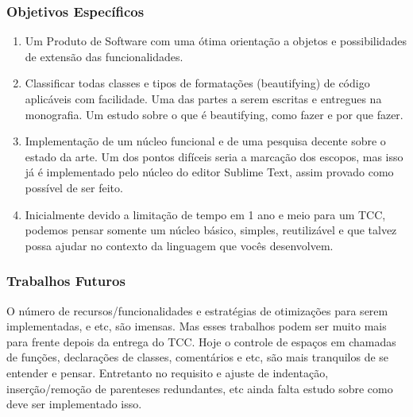 {\begin{enumerate}[leftmargin=*]
    \end{enumerate}


\subsubsection{Objetivos Específicos}


    \begin{enumerate}[leftmargin=*]

        \item

        Um Produto de Software com uma ótima orientação a objetos e possibilidades de extensão das
        funcionalidades.

        \item

        Classificar todas classes e tipos de formatações (beautifying) de código aplicáveis com
        facilidade. Uma das partes a serem escritas e entregues na monografia. Um estudo sobre o que
        é beautifying, como fazer e por que fazer.

        \item

        Implementação de um núcleo funcional e de uma pesquisa decente sobre o estado da arte. Um
        dos pontos difíceis seria a marcação dos escopos, mas isso já é implementado pelo núcleo do
        editor Sublime Text, assim provado como possível de ser feito.

        \item

        Inicialmente devido a limitação de tempo em 1 ano e meio para um TCC, podemos pensar somente
        um núcleo básico, simples, reutilizável e que talvez possa ajudar no contexto da linguagem
        que vocês desenvolvem.

    \end{enumerate}


\subsubsection{Trabalhos Futuros}

    O número de recursos/funcionalidades e estratégias de otimizações para serem implementadas, e
    etc, são imensas. Mas esses trabalhos podem ser muito mais para frente depois da entrega do TCC.
    Hoje o controle de espaços em chamadas de funções, declarações de classes, comentários e etc,
    são mais tranquilos de se entender e pensar. Entretanto no requisito e ajuste de indentação,
    inserção/remoção de parenteses redundantes, etc ainda falta estudo sobre como deve ser
    implementado isso.

}
